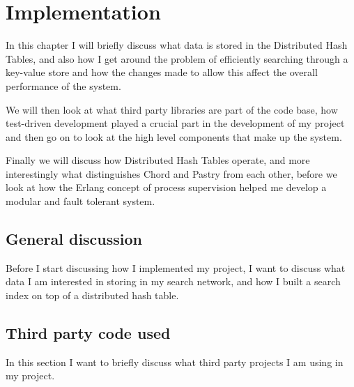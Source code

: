 

\section{Implementation}

In this chapter I will briefly discuss what data is stored in the Distributed Hash Tables, and also how I get around the problem of efficiently searching through a key-value store and how the changes made to allow this affect the overall performance of the system.

We will then look at what third party libraries are part of the code base, how test-driven development played a crucial part in the development of my project and then go on to look at the high level components that make up the system.

Finally we will discuss how Distributed Hash Tables operate, and more interestingly what distinguishes Chord and Pastry from each other, before we look at how the Erlang concept of process supervision helped me develop a modular and fault tolerant system.


\subsection{General discussion}
Before I start discussing how I implemented my project, I want to discuss what data I am interested in storing in my search network, and how I built a search index on top of a distributed hash table. 

\mbox{}


\subsection{Third party code used}
In this section I want to briefly discuss what third party projects I am using in my project.

